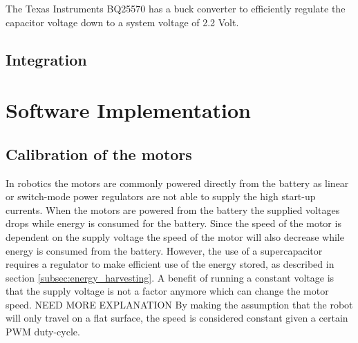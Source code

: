 The Texas Instruments BQ25570 has a buck converter to efficiently regulate the capacitor voltage down to a system voltage of 2.2 Volt.


\subsection{Integration}




\section{Software Implementation}




\subsection{Calibration of the motors}
\label{subsub:motor_calib}

In robotics the motors are commonly powered directly from the battery as linear or switch-mode power regulators are not able to supply the high start-up currents.
When the motors are powered from the battery the supplied voltages drops while energy is consumed for the battery.
Since the speed of the motor is dependent on the supply voltage the speed of the motor will also decrease while energy is consumed from the battery.
However, the use of a supercapacitor requires a regulator to make efficient use of the energy stored, as described in section \ref{subsec:energy_harvesting}.
A benefit of running a constant voltage is that the supply voltage is not a factor anymore which can change the motor speed.
NEED MORE EXPLANATION
By making the assumption that the robot will only travel on a flat surface, the speed is considered constant given a certain PWM duty-cycle.

